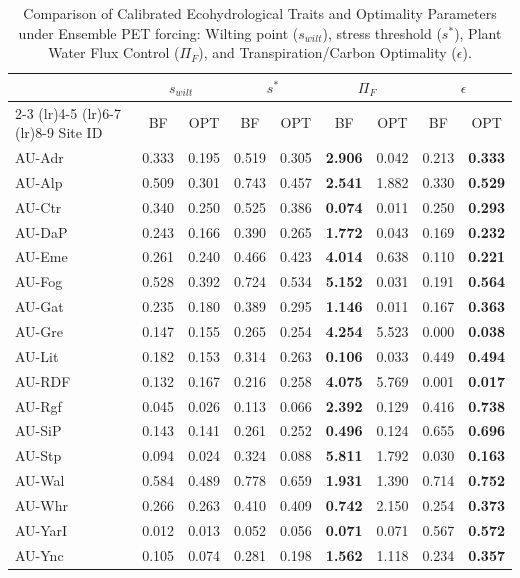 \documentclass[11pt,a4paper]{article}
\begin{document}
\begin{table}[H]
\centering
\caption{Comparison of Calibrated Ecohydrological Traits and Optimality Parameters under Ensemble PET forcing: Wilting point ($s_{wilt}$), stress threshold ($s^*$), Plant Water Flux Control ($\Pi_F$), and Transpiration/Carbon Optimality ($\epsilon$).}
\label{tab:traits_comp}
\begin{tabular}{lcccccccc}
\toprule
 & \multicolumn{2}{c}{$s_{wilt}$} & \multicolumn{2}{c}{$s^*$} & \multicolumn{2}{c}{$\Pi_F$} & \multicolumn{2}{c}{$\epsilon$} \\
\cmidrule(lr){2-3} \cmidrule(lr){4-5} \cmidrule(lr){6-7} \cmidrule(lr){8-9}
Site ID & BF & OPT & BF & OPT & BF & OPT & BF & OPT \\
\midrule
AU-Adr & 0.333 & 0.195 & 0.519 & 0.305 & \textbf{2.906} & 0.042 & 0.213 & \textbf{0.333} \\
AU-Alp & 0.509 & 0.301 & 0.743 & 0.457 & \textbf{2.541} & 1.882 & 0.330 & \textbf{0.529} \\
AU-Ctr & 0.340 & 0.250 & 0.525 & 0.386 & \textbf{0.074} & 0.011 & 0.250 & \textbf{0.293} \\
AU-DaP & 0.243 & 0.166 & 0.390 & 0.265 & \textbf{1.772} & 0.043 & 0.169 & \textbf{0.232} \\
AU-Eme & 0.261 & 0.240 & 0.466 & 0.423 & \textbf{4.014} & 0.638 & 0.110 & \textbf{0.221} \\
AU-Fog & 0.528 & 0.392 & 0.724 & 0.534 & \textbf{5.152} & 0.031 & 0.191 & \textbf{0.564} \\
AU-Gat & 0.235 & 0.180 & 0.389 & 0.295 & \textbf{1.146} & 0.011 & 0.167 & \textbf{0.363} \\
AU-Gre & 0.147 & 0.155 & 0.265 & 0.254 & \textbf{4.254} & 5.523 & 0.000 & \textbf{0.038} \\
AU-Lit & 0.182 & 0.153 & 0.314 & 0.263 & \textbf{0.106} & 0.033 & 0.449 & \textbf{0.494} \\
AU-RDF & 0.132 & 0.167 & 0.216 & 0.258 & \textbf{4.075} & 5.769 & 0.001 & \textbf{0.017} \\
AU-Rgf & 0.045 & 0.026 & 0.113 & 0.066 & \textbf{2.392} & 0.129 & 0.416 & \textbf{0.738} \\
AU-SiP & 0.143 & 0.141 & 0.261 & 0.252 & \textbf{0.496} & 0.124 & 0.655 & \textbf{0.696} \\
AU-Stp & 0.094 & 0.024 & 0.324 & 0.088 & \textbf{5.811} & 1.792 & 0.030 & \textbf{0.163} \\
AU-Wal & 0.584 & 0.489 & 0.778 & 0.659 & \textbf{1.931} & 1.390 & 0.714 & \textbf{0.752} \\
AU-Whr & 0.266 & 0.263 & 0.410 & 0.409 & \textbf{0.742} & 2.150 & 0.254 & \textbf{0.373} \\
AU-YarI & 0.012 & 0.013 & 0.052 & 0.056 & \textbf{0.071} & 0.071 & 0.567 & \textbf{0.572} \\
AU-Ync & 0.105 & 0.074 & 0.281 & 0.198 & \textbf{1.562} & 1.118 & 0.234 & \textbf{0.357} \\
\bottomrule
\end{tabular}
\end{table}
\end{document}
